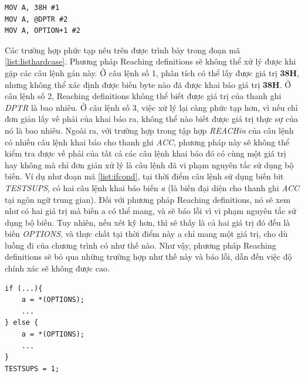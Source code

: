\begin{lstlisting}[caption={Một số câu lệnh gán mà phương pháp Suy luận kiểu sử dụng Reaching definitions không xử lý được},label={list:listhardcase}]
MOV A, 38H #1
MOV A, @DPTR #2
MOV A, OPTION+1 #2
\end{lstlisting}
Các trường hợp phức tạp nêu trên được trình bày trong đoạn mã \ref{list:listhardcase}. 
Phương pháp Reaching definitions sẽ không thể xử lý được khi gặp các câu lệnh gán này. Ở câu lệnh số 1, phân tích có thể lấy được giá trị \textbf{38H}, nhưng không thể xác định được biến byte nào đã được khai báo giá trị \textbf{38H}. Ở câu lệnh số 2, Reaching definitions không thể biết được giá trị của thanh ghi \textit{DPTR} là bao nhiêu. Ở câu lệnh số 3, việc xử lý lại càng phức tạp hơn, vì nếu chỉ đơn giản lấy vế phải của khai báo ra, không thể nào biết được giá trị thực sự của nó là bao nhiêu.
Ngoài ra, với trường hợp trong tập hợp \textit{REACHin} của câu lệnh có nhiều câu lệnh khai báo cho thanh ghi \textit{ACC}, phương pháp này sẽ không thể kiểm tra được vế phải của tất cả các câu lệnh khai báo đó có cùng một giá trị hay không mà chỉ đơn giản xử lý là câu lệnh đã vi phạm nguyên tắc sử dụng bộ biến. Ví dụ như đoạn mã \ref{list:ifcond}, tại thời điểm câu lệnh sử dụng biến bit \textit{TESTSUPS}, có hai câu lệnh khai báo biến \textit{a} (là biến đại diện cho thanh ghi \textit{ACC} tại ngôn ngữ trung gian). Đối với phương pháp Reaching definitions, nó sẽ xem như có hai giá trị mà biến a có thể mang, và sẽ báo lỗi vì vi phạm nguyên tắc sử dụng bộ biến. Tuy nhiên, nếu xét kỹ hơn, thì sẽ thấy là cả hai giá trị đó đều là biến \textit{OPTIONS}, và thực chất tại thời điểm này a chỉ mang một giá trị, cho dù luồng đi của chương trình có như thế nào. Như vậy, phương pháp Reaching definitions sẽ bỏ qua những trường hợp như thế này và báo lỗi, dẫn đến việc độ chính xác sẽ không được cao.
\begin{lstlisting}[caption={Đoạn mã có nhiều câu lệnh khai báo cho ACC đến được một điểm của chương trình nhưng tất cả đều cùng giá trị},label={list:ifcond}]
if (...){
	a = *(OPTIONS);
	...
} else {
	a = *(OPTIONS);
	...
}
TESTSUPS = 1;
\end{lstlisting}

